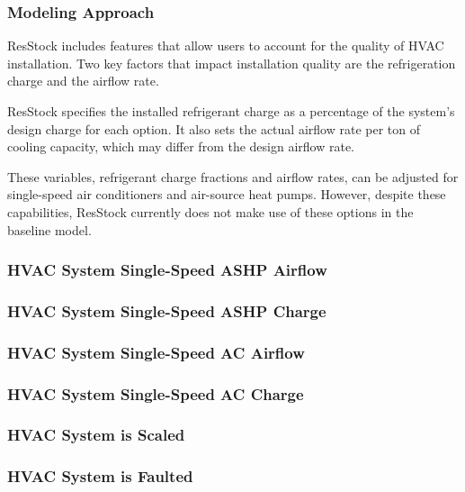 \subsubsection{Modeling Approach}
ResStock includes features that allow users to account for the quality of HVAC installation. Two key factors that impact installation quality are the refrigeration charge and the airflow rate.

ResStock specifies the installed refrigerant charge as a percentage of the system's design charge for each option. It also sets the actual airflow rate per ton of cooling capacity, which may differ from the design airflow rate.

These variables, refrigerant charge fractions and airflow rates, can be adjusted for single-speed air conditioners and air-source heat pumps. However, despite these capabilities, ResStock currently does not make use of these options in the baseline model.

\subsubsection{HVAC System Single-Speed ASHP Airflow}


\subsubsection{HVAC System Single-Speed ASHP Charge}


\subsubsection{HVAC System Single-Speed AC Airflow}


\subsubsection{HVAC System Single-Speed AC Charge}


\subsubsection{HVAC System is Scaled}


\subsubsection{HVAC System is Faulted}


